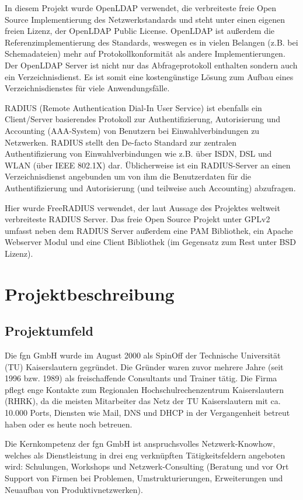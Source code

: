 \documentclass[11pt,a4paper,titlepage=firstiscover]{scrartcl} %
\begin{document}
In diesem Projekt wurde OpenLDAP verwendet, die verbreiteste freie Open Source Implementierung des Netzwerkstandards und steht unter einen eigenen freien Lizenz, der OpenLDAP Public License. OpenLDAP ist au\ss{}erdem die Referenzimplementierung des Standards, weswegen es in vielen Belangen (z.B. bei Schemadateien) mehr auf Protokollkonformit\"at als andere Implementierungen. Der OpenLDAP Server ist nicht nur das Abfrageprotokoll enthalten sondern auch ein Verzeichnisdienst. Es ist somit eine kosteng\"unstige L\"osung zum Aufbau eines Verzeichnisdienstes f\"ur viele Anwendungsf\"alle.

RADIUS (Remote Authentication Dial-In User Service) ist ebenfalls ein Client/Server basierendes Protokoll zur Authentifizierung, Autorisierung und Accounting (AAA-System) von Benutzern bei Einwahlverbindungen zu Netzwerken. RADIUS stellt den De-facto Standard zur zentralen Authentifizierung von Einwahlverbindungen wie z.B. über ISDN, DSL und WLAN (\"uber IEEE 802.1X) dar. \"Ublicherweise ist ein RADIUS-Server an einen Verzeichnisdienst angebunden um von ihm die Benutzerdaten f\"ur die Authentifizierung und Autorisierung (und teilweise auch Accounting) abzufragen.

Hier wurde FreeRADIUS verwendet, der laut Aussage des Projektes weltweit verbreiteste RADIUS Server. Das freie Open Source Projekt unter GPLv2 umfasst neben dem RADIUS Server au\ss{}erdem eine PAM Bibliothek, ein Apache Webserver Modul und eine Client Bibliothek (im Gegensatz zum Rest unter BSD Lizenz).

\section{Projektbeschreibung}
\subsection{Projektumfeld}
Die fgn GmbH wurde im August 2000 als SpinOff der Technische Universität (TU) Kaiserslautern gegründet. Die Gründer waren zuvor mehrere Jahre (seit 1996 bzw. 1989) als freischaffende Consultants und Trainer tätig. Die Firma pflegt enge Kontakte zum Regionalen Hochschulrechenzentrum Kaiserslautern (RHRK), da die meisten Mitarbeiter das Netz der TU Kaiserslautern mit ca. 10.000 Ports, Diensten wie Mail, DNS und DHCP in der Vergangenheit betreut haben oder es heute noch betreuen.

Die Kernkompetenz der fgn GmbH ist anspruchsvolles Netzwerk-Knowhow, welches als Dienstleistung in drei eng verknüpften Tätigkeitsfeldern angeboten wird: Schulungen, Workshops und Netzwerk-Consulting (Beratung und vor Ort Support von Firmen bei Problemen, Umstrukturierungen, Erweiterungen und Neuaufbau von Produktivnetzwerken).
\end{document}

